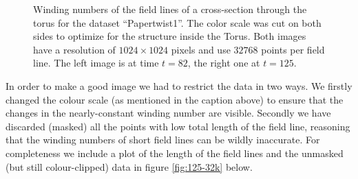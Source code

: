 \documentclass{article}
\begin{document}
\begin{figure}[!htb]
 \label{fig:125-32k}
\endminipage
	\caption{Winding numbers of the field lines of a cross-section through the torus for the dataset ``Papertwist1''. The color scale was cut on both sides to optimize for the structure inside the Torus. Both images have a resolution of $1024\times 1024$ pixels and use $32768$ points per field line. The left image is at time $t=82$, the right one at $t=125$.}\label{fig:125-32k}\label{fig:82-32k}

\end{figure}

In order to make a good image we had to restrict the data in two ways. We firstly changed the colour scale (as mentioned in the caption above) to ensure that the changes in the nearly-constant winding number are visible. Secondly we have discarded (masked) all the points with low total length of the field line, reasoning that the winding numbers of short field lines can be wildly inaccurate. For completeness we include a plot of the length of the field lines and the unmasked (but still colour-clipped) data in figure \ref{fig:125-32k} below.
\end{document}
